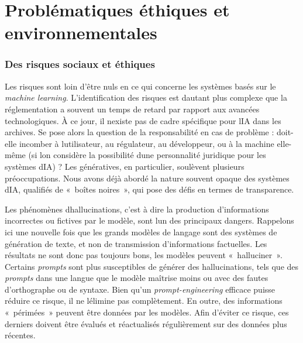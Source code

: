 \chapter{Problématiques éthiques et environnementales}

	\subsection{Des risques sociaux et éthiques}

	Les risques sont loin d'être nuls en ce qui concerne les systèmes basés sur le \emph{machine learning}. 
	L'identification des risques est d\textquotesingle autant plus
	complexe que la réglementation a souvent un temps de retard par rapport
	aux avancées technologiques. À ce jour, il n\textquotesingle existe pas
	de cadre spécifique pour l\textquotesingle IA dans les
	archives. Se pose alors la question de la responsabilité en cas de
	problème : doit-elle incomber à l\textquotesingle utilisateur, au
	régulateur, au développeur, ou à la machine elle-même (si
	l\textquotesingle on considère la possibilité d\textquotesingle une
	personnalité juridique pour les systèmes d\textquotesingle IA) ? Les \gls{générative}s, en particulier, soulèvent plusieurs préoccupations. Nous
	avons déjà abordé la nature souvent opaque des systèmes
	d\textquotesingle IA, qualifiés de «~boîtes noires~», qui pose des défis
	en termes de transparence.
	
	Les phénomènes d\textquotesingle \gls{hallucination}s, c'est à dire la
	production d'informations incorrectes ou fictives par le modèle, sont
	l\textquotesingle un des principaux dangers. Rappelons ici une nouvelle fois que les
	grands modèles de langage sont des systèmes de génération de texte, et non de
	transmission d'informations factuelles. Les résultats ne sont donc pas
	toujours bons, les modèles peuvent «~halluciner~». Certains \textit{\gls{prompt}s} sont
	plus susceptibles de générer des hallucinations, tels que des \textit{prompts}
	dans une langue que le modèle maîtrise moins ou avec des fautes
	d'orthographe ou de syntaxe. Bien qu'un \emph{prompt-engineering} efficace
	puisse réduire ce risque, il ne l\textquotesingle élimine pas
	complètement.
	En outre, des informations «~périmées~» peuvent être données par les
	modèles. Afin d'éviter ce risque, ces derniers doivent être évalués et réactualisés régulièrement sur des
	données plus récentes.
	
